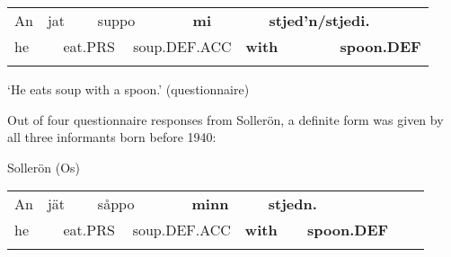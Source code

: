 \begin{tabular}{llllllllll}
\lsptoprule
An & \multicolumn{2}{l}{jat

} & \multicolumn{2}{l}{suppo

} & \multicolumn{2}{l}{{\bfseries mi}

} & \multicolumn{2}{l}{{\bfseries stjed’n/stjedi.}

} & \\
\multicolumn{2}{l}{he

} & \multicolumn{2}{l}{eat.PRS

} & \multicolumn{2}{l}{soup.DEF.ACC

} & \multicolumn{2}{l}{{\bfseries with}

} & \multicolumn{2}{l}{{\bfseries spoon.DEF}

}\\
\lspbottomrule
\end{tabular}

\begin{styleTranslation}
‘He eats soup with a spoon.’ (questionnaire)

\end{styleTranslation}

Out of four questionnaire responses from Sollerön, a definite form was given by all three informants born before 1940:

\begin{listWWNumileveli}
\item 

\begin{styleExample}
Sollerön (Os)

\end{styleExample}

\end{listWWNumileveli}

\begin{tabular}{llllllllllll}
\lsptoprule
An & \multicolumn{2}{l}{jät

} & \multicolumn{2}{l}{såppo

} & \multicolumn{2}{l}{{\bfseries minn}

} & \multicolumn{2}{l}{{\bfseries stjedn.}

} & \multicolumn{2}{l}{} & \\
\multicolumn{2}{l}{he

} & \multicolumn{2}{l}{eat.PRS

} & \multicolumn{2}{l}{soup.DEF.ACC

} & \multicolumn{2}{l}{{\bfseries with}

} & \multicolumn{2}{l}{{\bfseries spoon.DEF}

} & \multicolumn{2}{l}{}\\
\lspbottomrule
\end{tabular}

